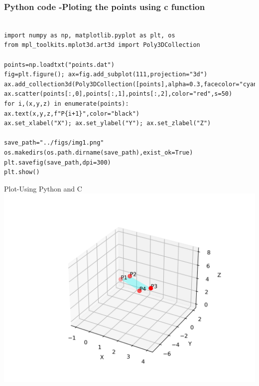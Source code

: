 \documentclass{beamer}
\begin{document}
\begin{frame}[fragile]                              
	\frametitle{Python code -Ploting the points using c function} 
	\begin{lstlisting}

import numpy as np, matplotlib.pyplot as plt, os
from mpl_toolkits.mplot3d.art3d import Poly3DCollection

points=np.loadtxt("points.dat")
fig=plt.figure(); ax=fig.add_subplot(111,projection="3d")
ax.add_collection3d(Poly3DCollection([points],alpha=0.3,facecolor="cyan"))
ax.scatter(points[:,0],points[:,1],points[:,2],color="red",s=50)
for i,(x,y,z) in enumerate(points): ax.text(x,y,z,f"P{i+1}",color="black")
ax.set_xlabel("X"); ax.set_ylabel("Y"); ax.set_zlabel("Z")

save_path="../figs/img1.png"
os.makedirs(os.path.dirname(save_path),exist_ok=True)
plt.savefig(save_path,dpi=300)
plt.show()

\end{lstlisting}                               
\end{frame}

\begin{frame}{Plot-Using  Python and C}
    \centering
    \includegraphics[width=\columnwidth, height=0.8\textheight, keepaspectratio]{../figs/img1.png}     
\end{frame}
\end{document}
